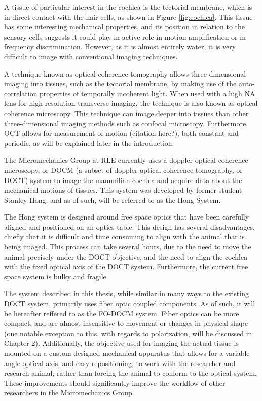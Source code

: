 A tissue of particular interest in the cochlea is the tectorial membrane, which is in direct contact with the hair cells, as shown in Figure \ref{fig:cochlea}. This tissue has some interesting mechanical properties, and its position in relation to the sensory cells suggests it could play in active role in motion amplification or in frequency discrimination. However, as it is almost entirely water, it is very difficult to image with conventional imaging techniques. \cite{needcitation}

A technique known as optical coherence tomography allows three-dimensional imaging into tissues, such as the tectorial membrane, by making use of the auto-correlation properties of temporally incoherent light. When used with a high NA lens for high resolution transverse imaging, the technique is also known as optical coherence microscopy. This technique can image deeper into tissues than other three-dimensional imaging methods such as confocal microscopy. Furthermore, OCT allows for measurement of motion (citation here?), both constant and periodic, as will be explained later in the introduction.

The Micromechanics Group at RLE currently uses a doppler optical coherence microscopy, or DOCM (a subset of doppler optical coherence tomography, or DOCT) system to image the mammilian cochlea and acquire data about the mechanical motions of tissues. This system was developed by former student Stanley Hong, and as of such, will be referred to as the Hong System. \cite{hong}

The Hong system is designed around free space optics that have been carefully aligned and positioned on an optics table. This design has several disadvantages, chiefly that it is difficult and time consuming to align with the animal that is being imaged. This process can take several hours, due to the need to move the animal precisely under the DOCT objective, and the need to align the cochlea with the fixed optical axis of the DOCT system. Furthermore, the current free space system is bulky and fragile.

The system described in this thesis, while similar in many ways to the existing DOCT system, primarily uses fiber optic coupled components. As of such, it will be hereafter reffered to as the FO-DOCM system. Fiber optics can be more compact, and are almost insensitive to movement or changes in physical shape (one notable exception to this, with regards to polarization, will be discussed in Chapter 2). Additionally, the objective used for imaging the actual tissue is mounted on a custom designed mechanical apparatus that allows for a variable angle optical axis, and easy repositioning, to work with the researcher and research animal, rather than forcing the animal to conform to the optical system. These improvements should significantly improve the workflow of other researchers in the Micromechanics Group.

